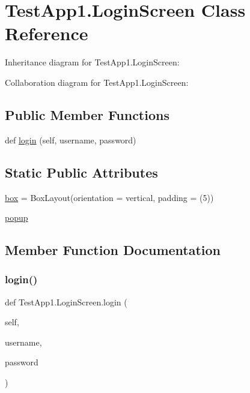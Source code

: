 \hypertarget{classTestApp1_1_1LoginScreen}{}\section{Test\+App1.\+Login\+Screen Class Reference}
\label{classTestApp1_1_1LoginScreen}


Inheritance diagram for Test\+App1.\+Login\+Screen\+:


Collaboration diagram for Test\+App1.\+Login\+Screen\+:
\subsection*{Public Member Functions}
\begin{DoxyCompactItemize}
\item 
def \hyperlink{classTestApp1_1_1LoginScreen_a112fceb7785f8596158f842d5c223936}{login} (self, username, password)
\end{DoxyCompactItemize}
\subsection*{Static Public Attributes}
\begin{DoxyCompactItemize}
\item 
\hyperlink{classTestApp1_1_1LoginScreen_ad9ee7d178fec4c941960ebf2e5ce8239}{box} = Box\+Layout(orientation = \textquotesingle{}vertical\textquotesingle{}, padding = (5))
\item 
\hyperlink{classTestApp1_1_1LoginScreen_ab64836ea6220beb4d6141a08d1c1cdb6}{popup}
\end{DoxyCompactItemize}


\subsection{Member Function Documentation}
\mbox{\label{classTestApp1_1_1LoginScreen_a112fceb7785f8596158f842d5c223936}} 
\subsubsection{\texorpdfstring{login()}{login()}}
{\footnotesize\ttfamily def Test\+App1.\+Login\+Screen.\+login (\begin{DoxyParamCaption}\item[{}]{self,  }\item[{}]{username,  }\item[{}]{password }\end{DoxyParamCaption})}



